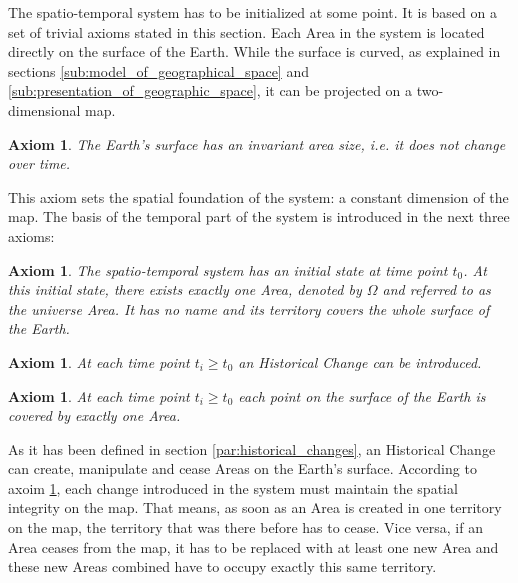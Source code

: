 The spatio-temporal system has to be initialized at some point. It is based on a set of trivial axioms stated in this section. Each Area in the system is located directly on the surface of the Earth. While the surface is curved, as explained in sections \ref{sub:model_of_geographical_space} and \ref{sub:presentation_of_geographic_space}, it can be projected on a two-dimensional map.

\vspace{-1.0em}
\newtheorem{invariant_surface}[assicounter]{Axiom}
\begin{invariant_surface}
\label{axm:invariant_surface}
  The Earth's surface has an invariant area size, i.e. it does not change over time.
\end{invariant_surface}

This axiom sets the spatial foundation of the system: a constant dimension of the map. The basis of the temporal part of the system is introduced in the next three axioms:

\vspace{-1.0em}
\newtheorem{initial_configuration}[assicounter]{Axiom}
\begin{initial_configuration}
\label{axm:initial_configuration}
  The spatio-temporal system has an initial state at time point $t_0$. At this initial state, there exists exactly one Area, denoted by $\Omega$ and referred to as the \emph{universe} Area. It has no name and its territory covers the whole surface of the Earth.
\end{initial_configuration}

\vspace{-1.5em}
\newtheorem{historical_change}[assicounter]{Axiom}
\begin{historical_change}
\label{axm:historical_change}
  At each time point $t_i \geq t_0$ an Historical Change can be introduced.
\end{historical_change}

\vspace{-1.5em}
\newtheorem{unique_coverage}[assicounter]{Axiom}
\begin{unique_coverage}
\label{axm:unique_coverage}
  At each time point $t_i \geq t_0$ each point on the surface of the Earth is covered by exactly one Area.
\end{unique_coverage}

As it has been defined in section \ref{par:historical_changes}, an Historical Change can create, manipulate and cease Areas on the Earth's surface. According to axoim \ref{axm:unique_coverage}, each change introduced in the system must maintain the spatial integrity on the map. That means, as soon as an Area is created in one territory on the map, the territory that was there before has to cease. Vice versa, if an Area ceases from the map, it has to be replaced with at least one new Area and these new Areas combined have to occupy exactly this same territory.

